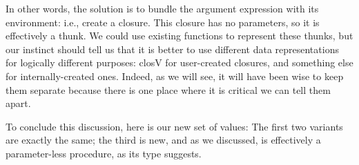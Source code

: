 In other words, the solution is to bundle the argument expression with its
environment: i.e., create a closure. This closure has no parameters, so it is
effectively a thunk. We could use existing functions to represent these thunks,
but our instinct should tell us that it is better to use different data
representations for logically different purposes: closV for user-created
closures, and something else for internally-created ones. Indeed, as we will
see, it will have been wise to keep them separate because there is one place
where it is critical we can tell them apart.

To conclude this discussion, here is our new set of values:
The first two variants are exactly the same; the third is new, and as we
discussed, is effectively a parameter-less procedure, as its type suggests.
